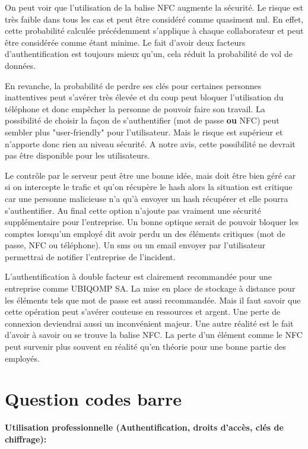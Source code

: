 \documentclass[12pt]{article}
\begin{document}
On peut voir que l'utilisation de la balise NFC augmente la sécurité. Le risque est très faible dans tous les cas et peut être considéré comme quasiment nul. En effet, cette probabilité calculée précédemment s'applique à chaque collaborateur et peut être considérée comme étant minime. Le fait d'avoir deux facteurs d'authentification est toujours mieux qu'un, cela réduit la probabilité de vol de données.

En revanche, la probabilité de perdre ses clés pour certaines personnes inattentives peut s'avérer très élevée et du coup peut bloquer l'utilisation du téléphone et donc empêcher la personne de pouvoir faire son travail. La possibilité de choisir la façon de s'authentifier (mot de passe \textbf{ou} NFC) peut sembler plus "user-friendly" pour l'utilisateur. Mais le risque est supérieur et n'apporte donc rien au niveau sécurité. A notre avis, cette possibilité ne devrait pas être disponible pour les utilisateurs.

Le contrôle par le serveur peut être une bonne idée, mais doit être bien géré car si on intercepte le trafic et qu'on récupère le hash alors la situation est critique car une personne malicieuse n'a qu'à envoyer un hash récupérer et elle pourra s'authentifier. Au final cette option n'ajoute pas vraiment une sécurité supplémentaire pour l'entreprise.
Un bonne optique serait de pouvoir bloquer les comptes lorsqu'un employé dit avoir perdu un des éléments critiques (mot de passe, NFC ou téléphone). Un sms ou un email envoyer par l'utilisateur permettrai de notifier l'entreprise de l'incident.

L'authentification à double facteur est clairement recommandée pour une entreprise comme UBIQOMP SA. La mise en place de stockage à distance pour les éléments tels que mot de passe est aussi recommandée. Mais il faut savoir que cette opération peut s'avérer couteuse en ressources et argent. Une perte de connexion deviendrai aussi un inconvénient majeur. Une autre réalité est le fait d'avoir à savoir ou se trouve la balise NFC. La perte d'un élément comme le NFC peut survenir plus souvent en réalité qu'en théorie pour une bonne partie des employés.

\section*{Question codes barre}

\textbf{Utilisation professionnelle (Authentification, droits d'accès, clés de chiffrage):}
\medskip
\end{document}
